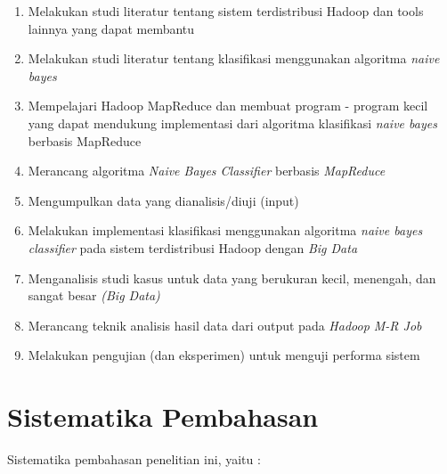 \begin{enumerate}
	\item Melakukan studi literatur tentang sistem terdistribusi Hadoop dan tools lainnya yang dapat membantu
		\item Melakukan studi literatur tentang klasifikasi menggunakan algoritma \textit{naive bayes}
		\item Mempelajari Hadoop MapReduce dan membuat program - program kecil yang dapat mendukung implementasi dari algoritma klasifikasi \textit{naive bayes} berbasis MapReduce
		\item Merancang algoritma \textit{Naive Bayes Classifier} berbasis \textit{MapReduce} 
		\item Mengumpulkan data yang dianalisis/diuji (input)
		\item Melakukan implementasi klasifikasi menggunakan algoritma \textit{naive bayes classifier} pada sistem terdistribusi Hadoop dengan \textit{Big Data}
		\item Menganalisis studi kasus untuk data yang berukuran kecil, menengah, dan sangat besar \textit{(Big Data)}
		\item Merancang teknik analisis hasil data dari output pada {\it Hadoop M-R Job}
		\item Melakukan pengujian (dan eksperimen) untuk menguji performa sistem
\end{enumerate}


\section{Sistematika Pembahasan}

Sistematika pembahasan penelitian ini, yaitu :

